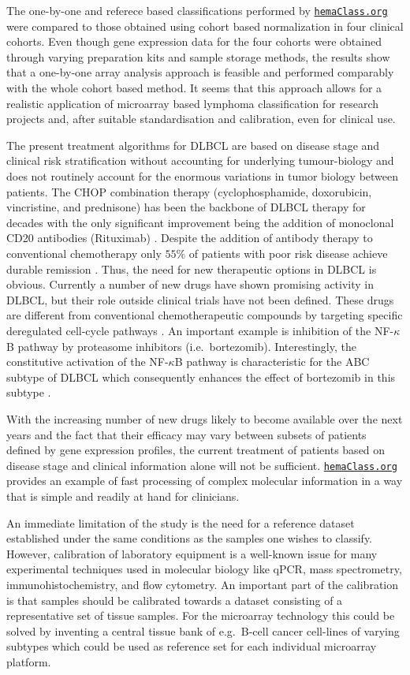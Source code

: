 \documentclass[twocolumn]{bmcart}%
\newcommand{\hemaClass}{\href{http://hemaClass.org}{\texttt{hemaClass.org}}}
\begin{document}
The one-by-one and referece based classifications performed by \hemaClass{} were compared to those obtained using cohort based normalization in four clinical cohorts.
Even though gene expression data for the four cohorts were obtained through varying preparation kits and sample storage methods, the results show that a one-by-one array analysis approach is feasible and performed comparably with the whole cohort based method.
It seems that this approach allows for a realistic application of microarray based lymphoma classification for research projects and, after suitable standardisation and calibration, even for clinical use.

The present treatment algorithms for DLBCL are based on disease stage and clinical risk stratification without accounting for underlying tumour-biology \cite{Schmoll2012} and does not routinely account for the enormous variations in tumor biology between patients.
The CHOP combination therapy (cyclophosphamide, doxorubicin, vincristine, and prednisone) has been the backbone of DLBCL therapy for decades with the only significant improvement being the addition of monoclonal CD20 antibodies (Rituximab) \cite{Coiffier2002a}.
Despite the addition of antibody therapy to conventional chemotherapy only $55\%$ of patients with poor risk disease achieve durable remission \cite{Ziepert2010}.
Thus, the need for new therapeutic options in DLBCL is obvious.
Currently a number of new drugs have shown promising activity in DLBCL, but their role outside clinical trials have not been defined.
These drugs are different from conventional chemotherapeutic compounds by targeting specific deregulated cell-cycle pathways \citep{Friedberg2011}.
An important example is inhibition of the NF-$\kappa$B pathway by proteasome inhibitors (i.e.\ bortezomib).
Interestingly, the constitutive activation of the NF-$\kappa$B pathway is characteristic for the ABC subtype of DLBCL which consequently enhances the effect of bortezomib in this subtype \citep{Dunleavy2009}.

With the increasing number of new drugs likely to become available over the next years and the fact that their efficacy may vary between subsets of patients defined by gene expression profiles, the current treatment of patients based on disease stage and clinical information alone will not be sufficient.
\hemaClass{} provides an example of fast processing of complex molecular information in a way that is simple and readily at hand for clinicians.

An immediate limitation of the study is the need for a reference dataset established under the same conditions as the samples one wishes to classify.
However, calibration of laboratory equipment is a well-known issue for many experimental techniques used in molecular biology like qPCR, mass spectrometry, immunohistochemistry, and flow cytometry.
An important part of the calibration is that samples should be calibrated towards a dataset consisting of a representative set of tissue samples.
For the microarray technology this could be solved by inventing a central tissue bank of e.g.\ B-cell cancer cell-lines of varying subtypes which could be used as reference set for each individual microarray platform.
\end{document}
